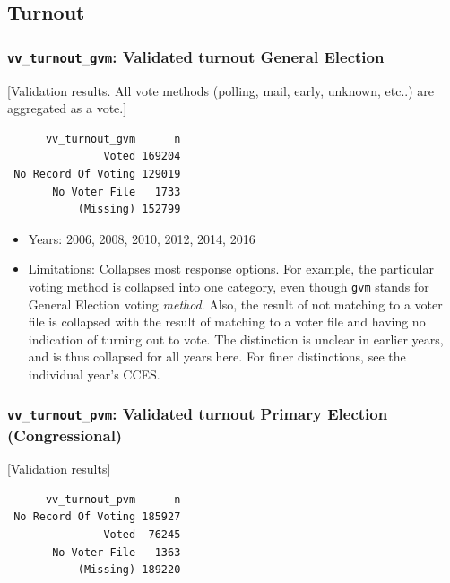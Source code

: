 \documentclass[10pt,article,oneside]{memoir}
\theoremstyle{definition}
\begin{document}
\subsection{Turnout}\label{turnout}

\subsubsection{\texorpdfstring{\texttt{vv\_turnout\_gvm}: Validated
turnout General
Election}{vv\_turnout\_gvm: Validated turnout General Election}}\label{vv_turnout_gvm-validated-turnout-general-election}

{[}Validation results. All vote methods (polling, mail, early, unknown,
etc..) are aggregated as a vote.{]}

\begin{verbatim}
      vv_turnout_gvm      n
               Voted 169204
 No Record Of Voting 129019
       No Voter File   1733
           (Missing) 152799
\end{verbatim}

\begin{itemize}
\tightlist
\item
  Years: 2006, 2008, 2010, 2012, 2014, 2016
\item
  Limitations: Collapses most response options. For example, the
  particular voting method is collapsed into one category, even though
  \texttt{gvm} stands for General Election voting \emph{method}. Also,
  the result of not matching to a voter file is collapsed with the
  result of matching to a voter file and having no indication of turning
  out to vote. The distinction is unclear in earlier years, and is thus
  collapsed for all years here. For finer distinctions, see the
  individual year's CCES.
\end{itemize}

\subsubsection{\texorpdfstring{\texttt{vv\_turnout\_pvm}: Validated
turnout Primary Election
(Congressional)}{vv\_turnout\_pvm: Validated turnout Primary Election (Congressional)}}\label{vv_turnout_pvm-validated-turnout-primary-election-congressional}

{[}Validation results{]}

\begin{verbatim}
      vv_turnout_pvm      n
 No Record Of Voting 185927
               Voted  76245
       No Voter File   1363
           (Missing) 189220
\end{verbatim}
\end{document}
